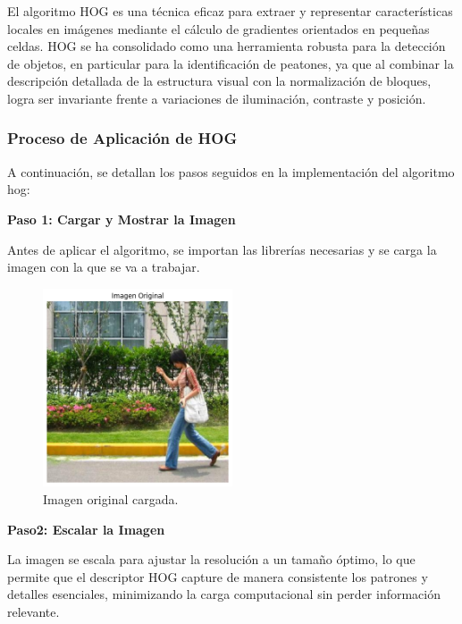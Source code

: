 \documentclass[a4paper]{article}
\begin{document}
El algoritmo HOG es una técnica eficaz para extraer y representar características locales en imágenes mediante el cálculo de gradientes orientados en pequeñas celdas. HOG se ha consolidado como una herramienta robusta para la detección de objetos, en particular para la identificación de peatones, ya que al combinar la descripción detallada de la estructura visual con la normalización de bloques, logra ser invariante frente a variaciones de iluminación, contraste y posición. 


\subsubsection{Proceso de Aplicación de HOG}

A continuación, se detallan los pasos seguidos en la implementación del algoritmo hog:
\par\vspace{0.5cm}

\textbf{Paso 1: Cargar y Mostrar la Imagen}
\par\vspace{0.5cm}

Antes de aplicar el algoritmo, se importan las librerías necesarias y se carga la imagen con la que se va a trabajar.

\begin{figure}[H]
    \centering
    \includegraphics[width=0.5\textwidth]{images/hog_paso_1.png}
    \caption{Imagen original cargada.}
\end{figure}

\textbf{Paso2: Escalar la Imagen}
\par\vspace{0.5cm}

La imagen se escala para ajustar la resolución a un tamaño óptimo, lo que permite que el descriptor HOG capture de manera consistente los patrones y detalles esenciales, minimizando la carga computacional sin perder información relevante.
\end{document}
